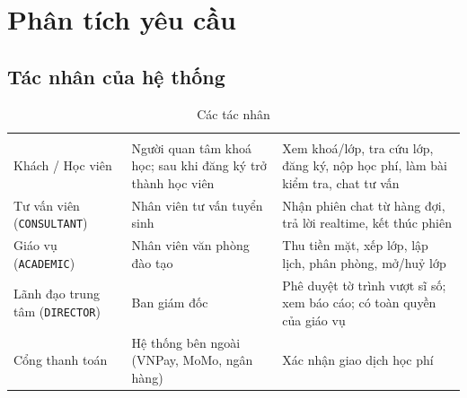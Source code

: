 \chapter{Phân tích yêu cầu}
\label{ch:analysis}

\section{Tác nhân của hệ thống}
\begin{xltabular}{\linewidth}{|L{3.6cm}|Y|L{5cm}|}
  \caption{Các tác nhân}\label{tab:actors}\\ \hline
  \headrow {} &  &  \\ \hline
  \endfirsthead \hline
  \headrow {} &  &  \\ \hline
  \endhead
  Khách / Học viên & Người quan tâm khoá học; sau khi đăng ký trở thành học viên & Xem khoá/lớp, tra cứu lớp, đăng ký, nộp học phí, làm bài kiểm tra, chat tư vấn \\ \hline
  Tư vấn viên (\texttt{CONSULTANT}) & Nhân viên tư vấn tuyển sinh & Nhận phiên chat từ hàng đợi, trả lời realtime, kết thúc phiên \\ \hline
  Giáo vụ (\texttt{ACADEMIC}) & Nhân viên văn phòng đào tạo & Thu tiền mặt, xếp lớp, lập lịch, phân phòng, mở/huỷ lớp \\ \hline
  Lãnh đạo trung tâm (\texttt{DIRECTOR}) & Ban giám đốc & Phê duyệt tờ trình vượt sĩ số; xem báo cáo; có toàn quyền của giáo vụ \\ \hline
  Cổng thanh toán & Hệ thống bên ngoài (VNPay, MoMo, ngân hàng) & Xác nhận giao dịch học phí \\ \hline
\end{xltabular}

